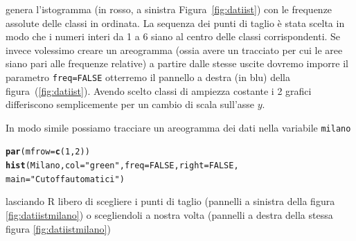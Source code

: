 \documentclass[onecolumn,12pt]{book}\usepackage[]{graphicx}\usepackage[]{color}
\makeatletter
\newcommand{\hlnum}[1]{\textcolor[rgb]{0.686,0.059,0.569}{#1}}%
\newcommand{\hlstr}[1]{\textcolor[rgb]{0.192,0.494,0.8}{#1}}%
\newcommand{\hlstd}[1]{\textcolor[rgb]{0.345,0.345,0.345}{#1}}%
\newcommand{\hlkwc}[1]{\textcolor[rgb]{0.333,0.667,0.333}{#1}}%
\newcommand{\hlkwd}[1]{\textcolor[rgb]{0.737,0.353,0.396}{\textbf{#1}}}%
\newenvironment{kframe}{%
 \def\at@end@of@kframe{}%
 \ifinner\ifhmode%
  \def\at@end@of@kframe{\end{minipage}}%
  \begin{minipage}{\columnwidth}%
 \fi\fi%
 \def\FrameCommand##1{\hskip\@totalleftmargin \hskip-\fboxsep
 \colorbox{shadecolor}{##1}\hskip-\fboxsep
     \hskip-\linewidth \hskip-\@totalleftmargin \hskip\columnwidth}%
 \MakeFramed {\advance\hsize-\width
   \@totalleftmargin\z@ \linewidth\hsize
   \@setminipage}}%
 {\par\unskip\endMakeFramed%
 \at@end@of@kframe}
\newenvironment{knitrout}{}{} %
\makeatother
\begin{document}
genera l'istogramma (in rosso, a sinistra Figura~\ref{fig:datiist}) con le frequenze assolute delle classi in ordinata. La sequenza dei punti di taglio \`e stata scelta in modo che i numeri interi da 1 a 6 siano al centro delle classi corrispondenti. Se invece volessimo creare un areogramma  (ossia avere un tracciato per cui le aree siano pari alle frequenze relative) a partire dalle stesse uscite dovremo imporre il parametro \texttt{freq=FALSE} otterremo il pannello a destra (in blu) della figura~(\ref{fig:datiist}). Avendo scelto classi di ampiezza costante i 2 grafici differiscono semplicemente per un cambio di scala sull'asse $y$.

In modo simile possiamo tracciare un areogramma  dei dati nella variabile \texttt{milano}
\begin{knitrout}
\color{fgcolor}\begin{kframe}
\begin{alltt}
\hlkwd{par}\hlstd{(}\hlkwc{mfrow}\hlstd{=}\hlkwd{c}\hlstd{(}\hlnum{1}\hlstd{,}\hlnum{2}\hlstd{))}
\hlkwd{hist}\hlstd{(Milano,} \hlkwc{col}\hlstd{=}\hlstr{"green"}\hlstd{,}\hlkwc{freq}\hlstd{=}\hlnum{FALSE}\hlstd{,}\hlkwc{right}\hlstd{=}\hlnum{FALSE}\hlstd{,}
\hlkwc{main}\hlstd{=}\hlstr{"Cutoff automatici"}\hlstd{)}
\end{alltt}
\end{kframe}
\end{knitrout}
lasciando \textsf{R} libero di scegliere i punti di taglio (pannelli a sinistra della figura \ref{fig:datiistmilano}) o scegliendoli a nostra volta (pannelli a destra della stessa figura  \ref{fig:datiistmilano})
\end{document}
